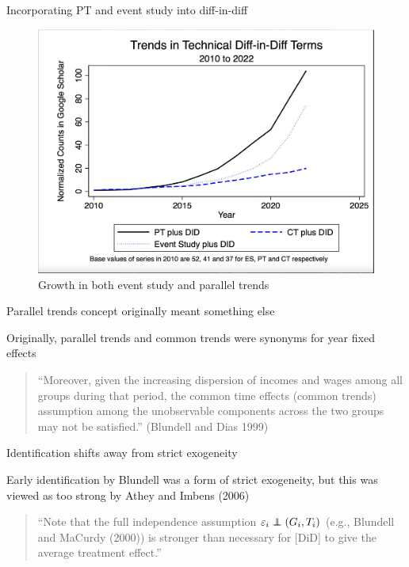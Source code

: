 \documentclass{beamer}
\newcommand\independent{\protect\mathpalette{\protect\independenT}{\perp}}
\def\independenT#1#2{\mathrel{\rlap{$#1#2$}\mkern2mu{#1#2}}}
\begin{document}
\begin{frame}{Incorporating PT and event study into diff-in-diff}

	\begin{figure}
	\caption{Growth in both event study and parallel trends}
	\includegraphics[scale=0.2]{./lecture_includes/espt_3}
	\end{figure}


\end{frame}





\begin{frame}{Parallel trends concept originally meant something else}


 Originally, parallel trends and common trends were synonyms for year fixed effects 
 
 \bigskip
 
	\begin{quote}
	“Moreover, given the increasing dispersion of incomes and wages among all groups during that period, the common time effects (common trends) assumption among the unobservable components across the two groups may not be satisfied.” (Blundell and Dias 1999)
	\end{quote}


\end{frame}

\begin{frame}{Identification shifts away from strict exogeneity}


 Early identification by Blundell was a form of strict exogeneity, but this was viewed as too strong by Athey and Imbens (2006) 
 
 \bigskip

\begin{quote}
“Note that the full independence assumption $\varepsilon_i \independent(G_i,T_i)$ (e.g., Blundell and MaCurdy (2000)) is stronger than necessary for [DiD] to give the average treatment effect.”
\end{quote}


\end{frame}
\end{document}
